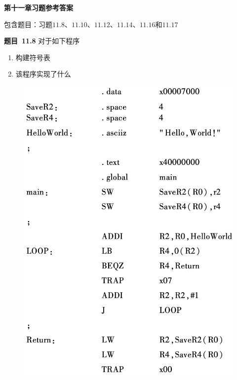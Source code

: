 \documentclass[10pt,a4paper,UTF8]{ctexart}
\newcommand{\problemname}{待定义}
\newenvironment{problem}{\begin{shaded}\par\noindent\textbf{题目\  \problemname}}{\end{shaded}\par}
\begin{document}
\begin{center}
\LARGE\textbf{第十一章习题参考答案}
\end{center}

{\kaishu 包含题目：习题$11.8$、$11.10$、$11.12$、$11.14$、$11.16$和$11.17$}



	



\renewcommand{\problemname}{11.8}
\begin{problem}
	对于如下程序
	\begin{enumerate}[(1)]
		\item 构建符号表
		\item 该程序实现了什么
	\end{enumerate}
\end{problem}

\begin{figure}[H]
	\centering
	\includegraphics[scale=0.45]{img/11.8}
\end{figure}
\end{document}
